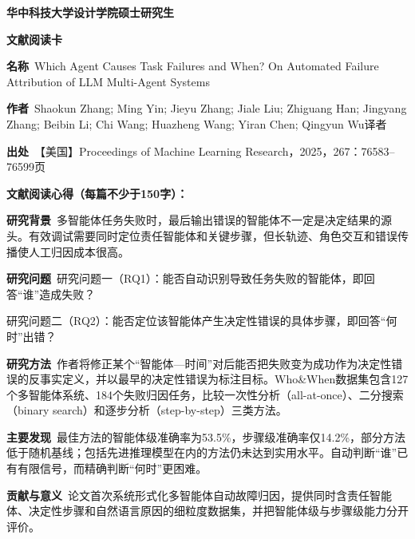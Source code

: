 \clearpage
\begin{center}
{\songti\bfseries\fontsize{18.5pt}{27.75pt}\selectfont 华中科技大学设计学院硕士研究生\par}
{\songti\bfseries\fontsize{18.5pt}{27.75pt}\selectfont 文献阅读卡\par}
\end{center}
\vspace{0.25em}
\noindent\underline{}\par
\vspace{0.35em}
\noindent\textbf{名称}\ Which Agent Causes Task Failures and When? On Automated Failure Attribution of LLM Multi-Agent Systems\par
\noindent\textbf{作者}\ Shaokun Zhang; Ming Yin; Jieyu Zhang; Jiale Liu; Zhiguang Han; Jingyang Zhang; Beibin Li; Chi Wang; Huazheng Wang; Yiran Chen; Qingyun Wu\quad 译者\par
\noindent\textbf{出处}\ 【美国】Proceedings of Machine Learning Research，2025，267：76583–76599\quad 页\par
\vspace{0.35em}
\noindent\textbf{文献阅读心得（每篇不少于150字）：}\par
\noindent\textbf{研究背景}\ 多智能体任务失败时，最后输出错误的智能体不一定是决定结果的源头。有效调试需要同时定位责任智能体和关键步骤，但长轨迹、角色交互和错误传播使人工归因成本很高。\par
\noindent\textbf{研究问题}\ 研究问题一（RQ1）：能否自动识别导致任务失败的智能体，即回答“谁”造成失败？\par
研究问题二（RQ2）：能否定位该智能体产生决定性错误的具体步骤，即回答“何时”出错？\par
\noindent\textbf{研究方法}\ 作者将修正某个“智能体—时间”对后能否把失败变为成功作为决定性错误的反事实定义，并以最早的决定性错误为标注目标。Who\&When数据集包含127个多智能体系统、184个失败归因任务，比较一次性分析（all-at-once）、二分搜索（binary search）和逐步分析（step-by-step）三类方法。\par
\noindent\textbf{主要发现}\ 最佳方法的智能体级准确率为53.5\%，步骤级准确率仅14.2\%，部分方法低于随机基线；包括先进推理模型在内的方法仍未达到实用水平。自动判断“谁”已有有限信号，而精确判断“何时”更困难。\par
\noindent\textbf{贡献与意义}\ 论文首次系统形式化多智能体自动故障归因，提供同时含责任智能体、决定性步骤和自然语言原因的细粒度数据集，并把智能体级与步骤级能力分开评价。\par
\clearpage
